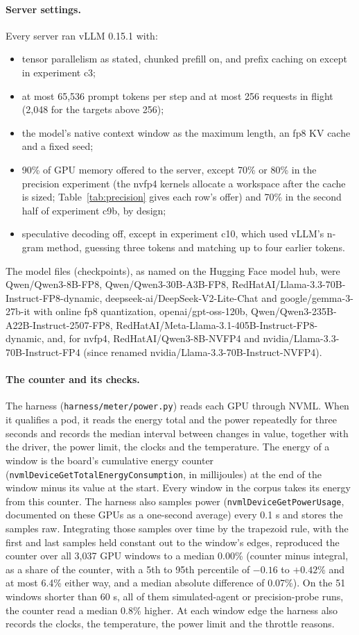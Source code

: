 \documentclass[11pt]{article}
\begin{document}
\paragraph{Server settings.} Every server ran vLLM 0.15.1 with:
\begin{itemize}
\item tensor parallelism as stated, chunked prefill on, and prefix caching on except in experiment c3;
\item at most 65,536 prompt tokens per step and at most 256 requests in flight (2,048 for the targets above 256);
\item the model's native context window as the maximum length, an fp8 KV cache and a fixed seed;
\item 90\% of GPU memory offered to the server, except 70\% or 80\% in the precision experiment (the nvfp4 kernels allocate a workspace after the cache is sized; Table~\ref{tab:precision} gives each row's offer) and 70\% in the second half of experiment c9b, by design;
\item speculative decoding off, except in experiment c10, which used vLLM's n-gram method, guessing three tokens and matching up to four earlier tokens.
\end{itemize}
The model files (checkpoints), as named on the Hugging Face model hub, were Qwen/Qwen3-8B-FP8, Qwen/Qwen3-30B-A3B-FP8, RedHatAI/Llama-3.3-70B-Instruct-FP8-dynamic, deepseek-ai/DeepSeek-V2-Lite-Chat and google/gemma-3-27b-it with online fp8 quantization, openai/gpt-oss-120b, Qwen/Qwen3-235B-A22B-Instruct-2507-FP8, RedHatAI/Meta-Llama-3.1-405B-Instruct-FP8-dynamic, and, for nvfp4, RedHatAI/Qwen3-8B-NVFP4 and nvidia/Llama-3.3-70B-Instruct-FP4 (since renamed nvidia/Llama-3.3-70B-Instruct-NVFP4).

\paragraph{The counter and its checks.} The harness (\texttt{harness/meter/power.py}) reads each GPU through NVML. When it qualifies a pod, it reads the energy total and the power repeatedly for three seconds and records the median interval between changes in value, together with the driver, the power limit, the clocks and the temperature. The energy of a window is the board's cumulative energy counter (\texttt{nvmlDeviceGetTotalEnergyConsumption}, in millijoules) at the end of the window minus its value at the start. Every window in the corpus takes its energy from this counter. The harness also samples power (\texttt{nvmlDeviceGetPowerUsage}, documented on these GPUs as a one-second average) every 0.1 s and stores the samples raw. Integrating those samples over time by the trapezoid rule, with the first and last samples held constant out to the window's edges, reproduced the counter over all 3,037 GPU windows to a median $0.00$\% (counter minus integral, as a share of the counter, with a 5th to 95th percentile of $-0.16$ to $+0.42$\% and at most 6.4\% either way, and a median absolute difference of 0.07\%). On the 51 windows shorter than 60 s, all of them simulated-agent or precision-probe runs, the counter read a median 0.8\% higher. At each window edge the harness also records the clocks, the temperature, the power limit and the throttle reasons.
\end{document}
